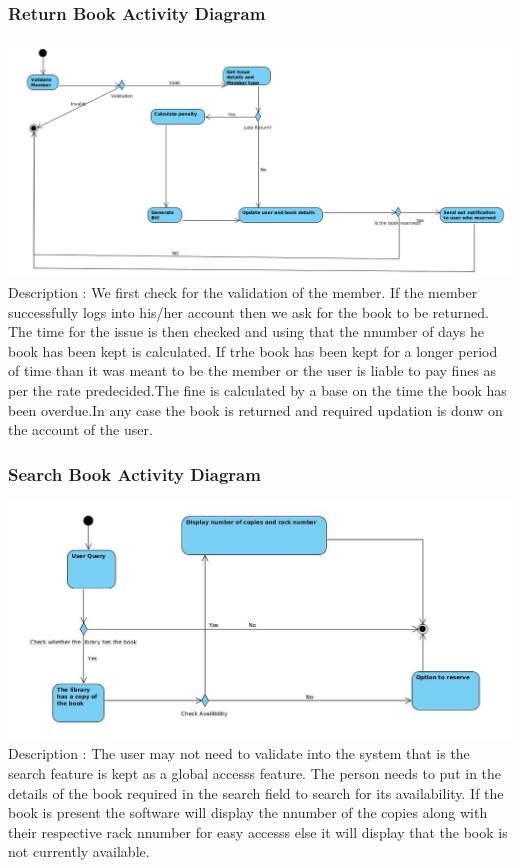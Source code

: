 \documentclass[a4paper]{article}
\begin{document}
\subsubsection*{Return Book Activity Diagram}
\includegraphics[scale=0.40]{images/activityDiagReturn.png}
\\
Description : We first check for the validation of the member. If the member successfully logs into his/her account then we ask for the book to be returned. The time for the issue is then checked and using that the nnumber of days he book has been kept is calculated. If trhe book has been kept for a longer period of time than it was meant to be the member or the user is liable to pay fines as per the rate predecided.The fine is calculated by a base on the time the book has been overdue.In any case the book is returned and required updation is donw on the account of the user.
\subsubsection*{Search Book Activity Diagram}
\includegraphics[scale=0.50]{images/activityDiagSearch.jpg}
\\
Description : The user may not need to validate into the system that is the search feature is kept as a global accesss feature. The person needs to put in the details of the book required in the search field to search for its availability. If the book is present the software will display the nnumber of the copies along with their respective rack nnumber for easy accesss else it will display that the book is not currently available.
\end{document}

